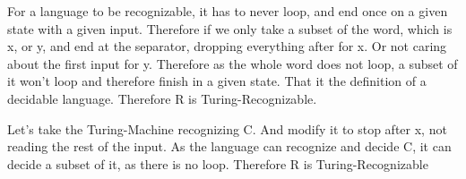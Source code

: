 
For a language to be recognizable, it has to never loop, and end once on a given state with a given input. Therefore if we only take a subset of the word, which is x, or y, and end at the separator, dropping everything after for x. Or not caring about the first input for y. Therefore as the whole word does not loop, a subset of it won't loop and therefore finish in a given state. That it the definition of a decidable language. Therefore R is Turing-Recognizable.

Let's take the Turing-Machine recognizing C. And modify it to stop after x, not reading the rest of the input. As the language can recognize and decide C, it can decide a subset of it, as there is no loop. Therefore R is Turing-Recognizable